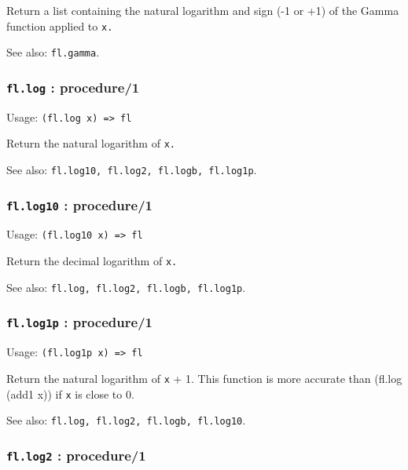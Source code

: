 \documentclass[
]{article}
\newcommand{\passthrough}[1]{#1}
\begin{document}
Return a list containing the natural logarithm and sign (-1 or +1) of
the Gamma function applied to \passthrough{\lstinline!x.!}

See also: \passthrough{\lstinline!fl.gamma!}.

\hypertarget{fl.log-procedure1}{%
\subsubsection{\texorpdfstring{\texttt{fl.log} :
procedure/1}{fl.log : procedure/1}}\label{fl.log-procedure1}}

Usage: \passthrough{\lstinline!(fl.log x) => fl!}

Return the natural logarithm of \passthrough{\lstinline!x.!}

See also:
\passthrough{\lstinline!fl.log10, fl.log2, fl.logb, fl.log1p!}.

\hypertarget{fl.log10-procedure1}{%
\subsubsection{\texorpdfstring{\texttt{fl.log10} :
procedure/1}{fl.log10 : procedure/1}}\label{fl.log10-procedure1}}

Usage: \passthrough{\lstinline!(fl.log10 x) => fl!}

Return the decimal logarithm of \passthrough{\lstinline!x.!}

See also: \passthrough{\lstinline!fl.log, fl.log2, fl.logb, fl.log1p!}.

\hypertarget{fl.log1p-procedure1}{%
\subsubsection{\texorpdfstring{\texttt{fl.log1p} :
procedure/1}{fl.log1p : procedure/1}}\label{fl.log1p-procedure1}}

Usage: \passthrough{\lstinline!(fl.log1p x) => fl!}

Return the natural logarithm of \passthrough{\lstinline!x!} + 1. This
function is more accurate than (fl.log (add1 x)) if
\passthrough{\lstinline!x!} is close to 0.

See also: \passthrough{\lstinline!fl.log, fl.log2, fl.logb, fl.log10!}.

\hypertarget{fl.log2-procedure1}{%
\subsubsection{\texorpdfstring{\texttt{fl.log2} :
procedure/1}{fl.log2 : procedure/1}}\label{fl.log2-procedure1}}
\end{document}
